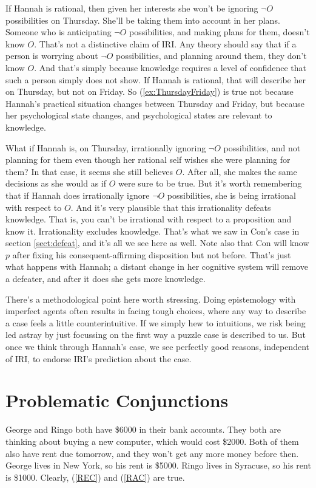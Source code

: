 \documentclass[oneside]{book}
\begin{document}
If Hannah is rational, then given her interests she won't be ignoring \(\neg O\) possibilities on Thursday. She'll be taking them into account in her plans. Someone who is anticipating \(\neg O\) possibilities, and making plans for them, doesn't know \(O\). That's not a distinctive claim of IRI. Any theory should say that if a person is worrying about \(\neg O\) possibilities, and planning around them, they don't know \(O\). And that's simply because knowledge requires a level of confidence that such a person simply does not show. If Hannah is rational, that will describe her on Thursday, but not on Friday. So (\ref{ex:ThursdayFriday}) is true not because Hannah's practical situation changes between Thursday and Friday, but because her psychological state changes, and psychological states are relevant to knowledge.

What if Hannah is, on Thursday, irrationally ignoring \(\neg O\) possibilities, and not planning for them even though her rational self wishes she were planning for them? In that case, it seems she still believes \(O\). After all, she makes the same decisions as she would as if \(O\) were sure to be true. But it's worth remembering that if Hannah does irrationally ignore \(\neg O\) possibilities, she is being irrational with respect to \(O\). And it's very plausible that this irrationality defeats knowledge. That is, you can't be irrational with respect to a proposition and know it. Irrationality excludes knowledge. That's what we saw in Con's case in section \ref{sect:defeat}, and it's all we see here as well. Note also that Con will know $p$ after fixing his consequent-affirming disposition but not before. That's just what happens with Hannah; a distant change in her cognitive system will remove a defeater, and after it does she gets more knowledge.

There's a methodological point here worth stressing. Doing epistemology with imperfect agents often results in facing tough choices, where any way to describe a case feels a little counterintuitive. If we simply hew to intuitions, we risk being led astray by just focussing on the first way a puzzle case is described to us. But once we think through Hannah's case, we see perfectly good reasons, independent of IRI, to endorse IRI's prediction about the case.

\section{Problematic Conjunctions} \label{sect:conj}
 George and Ringo both have \$6000 in their bank accounts. They both are thinking about buying a new computer, which would cost \$2000. Both of them also have rent due tomorrow, and they won't get any more money before then. George lives in New York, so his rent is \$5000. Ringo lives in Syracuse, so his rent is \$1000. Clearly, (\ref{REC}) and (\ref{RAC}) are true.
\end{document}
